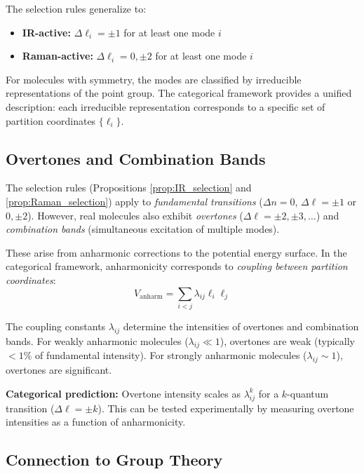 \documentclass[twocolumn,10pt]{article}
\theoremstyle{remark}
\begin{document}
The selection rules generalize to:
\begin{itemize}
    \item \textbf{IR-active:} $\Delta \ell_i = \pm 1$ for at least one mode $i$
    \item \textbf{Raman-active:} $\Delta \ell_i = 0, \pm 2$ for at least one mode $i$
\end{itemize}

For molecules with symmetry, the modes are classified by irreducible representations of the point group. The categorical framework provides a unified description: each irreducible representation corresponds to a specific set of partition coordinates $\{\ell_i\}$.

\subsection{Overtones and Combination Bands}

The selection rules (Propositions \ref{prop:IR_selection} and \ref{prop:Raman_selection}) apply to \textit{fundamental transitions} ($\Delta n = 0$, $\Delta \ell = \pm 1$ or $0, \pm 2$). However, real molecules also exhibit \textit{overtones} ($\Delta \ell = \pm 2, \pm 3, \ldots$) and \textit{combination bands} (simultaneous excitation of multiple modes).

These arise from anharmonic corrections to the potential energy surface. In the categorical framework, anharmonicity corresponds to \textit{coupling between partition coordinates}:
\begin{equation}
    V_{\text{anharm}} = \sum_{i < j} \lambda_{ij} \ell_i \ell_j
    \label{eq:anharmonic_coupling}
\end{equation}

The coupling constants $\lambda_{ij}$ determine the intensities of overtones and combination bands. For weakly anharmonic molecules ($\lambda_{ij} \ll 1$), overtones are weak (typically $< 1\%$ of fundamental intensity). For strongly anharmonic molecules ($\lambda_{ij} \sim 1$), overtones are significant.

\textbf{Categorical prediction:} Overtone intensity scales as $\lambda_{ij}^k$ for a $k$-quantum transition ($\Delta \ell = \pm k$). This can be tested experimentally by measuring overtone intensities as a function of anharmonicity.

\subsection{Connection to Group Theory}
\end{document}
